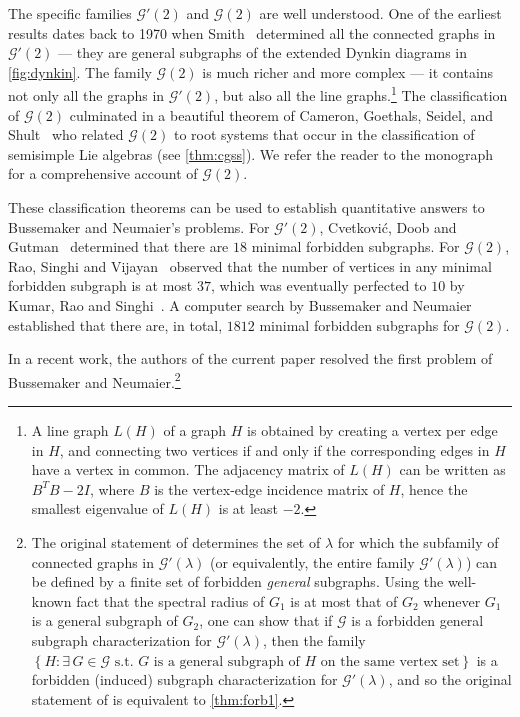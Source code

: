 \documentclass[11pt]{article}
\theoremstyle{definition}
\theoremstyle{remark}
\newcommand{\dset}[2]{\left\{{#1}\colon{#2}\right\}}
\newcommand{\la}{\lambda}
\newcommand{\G}{\mathcal{G}}
\newcommand{\Gp}{\G'(\la)}
\begin{document}
The specific families $\G'(2)$ and $\G(2)$ are well understood. One of the earliest results dates back to 1970 when Smith~\cite{S70} determined all the connected graphs in $\G'(2)$ --- they are general subgraphs of the extended Dynkin diagrams in \cref{fig:dynkin}. The family $\G(2)$ is much richer and more complex --- it contains not only all the graphs in $\G'(2)$, but also all the line graphs.\footnote{A line graph $L(H)$ of a graph $H$ is obtained by creating a vertex per edge in $H$, and connecting two vertices if and only if the corresponding edges in $H$ have a vertex in common. The adjacency matrix of $L(H)$ can be written as $B^TB - 2I$, where $B$ is the vertex-edge incidence matrix of $H$, hence the smallest eigenvalue of $L(H)$ is at least $-2$.\label{footnote:line-graph}} The classification of $\G(2)$ culminated in a beautiful theorem of Cameron, Goethals, Seidel, and Shult~\cite{CGSS76} who related $\G(2)$ to root systems that occur in the classification of semisimple Lie algebras (see \cref{thm:cgss}). We refer the reader to the monograph \cite{CRS04} for a comprehensive account of $\G(2)$.

These classification theorems can be used to establish quantitative answers to Bussemaker and Neumaier's problems. For $\G'(2)$, Cvetkovi\'{c}, Doob and Gutman~\cite[Theorem~2.8]{CDG82} determined that there are $18$ minimal forbidden subgraphs. For $\G(2)$, Rao, Singhi and Vijayan~\cite[Theorem~4.1]{RSV81} observed that the number of vertices in any minimal forbidden subgraph is at most $37$, which was eventually perfected to $10$ by Kumar, Rao and Singhi~\cite{KRS82}. A computer search by Bussemaker and Neumaier~\cite[p~596]{BN92} established that there are, in total, $1812$ minimal forbidden subgraphs for $\G(2)$.

In a recent work, the authors of the current paper resolved the first problem of Bussemaker and Neumaier.\footnote{The original statement of \cite[Theorem~1]{JP20} determines the set of $\la$ for which the subfamily of connected graphs in $\Gp$ (or equivalently, the entire family $\G'(\la)$) can be defined by a finite set of forbidden \emph{general} subgraphs. Using the well-known fact that the spectral radius of $G_1$ is at most that of $G_2$ whenever $G_1$ is a general subgraph of $G_2$, one can show that if $\G$ is a forbidden general subgraph characterization for $\Gp$, then the family $\dset{H}{\exists\, G \in \G \text{ s.t. }G\text{ is a general subgraph of }H\text{ on the same vertex set}}$ is a forbidden (induced) subgraph characterization for $\Gp$, and so the original statement of \cite[Theorem~1]{JP20} is equivalent to \cref{thm:forb1}.}
\end{document}
